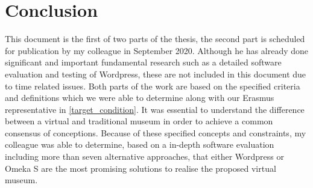 \chapter{Conclusion}

This document is the first of two parts of the thesis, the second part is scheduled for publication by my colleague in September 2020. Although he has already done significant and important fundamental research such as a detailed software evaluation and testing of Wordpress, these are not included in this document due to time related issues. Both parts of the work are based on the specified criteria and definitions which we were able to determine along with our Erasmus representative in \ref{target_condition}. It was essential to understand the difference between a virtual and traditional museum in order to achieve a common consensus of conceptions. Because of these specified concepts and constraints, my colleague was able to determine, based on a in-depth software evaluation including more than seven alternative approaches, that either Wordpress or Omeka S are the most promising solutions to realise the proposed virtual museum.

